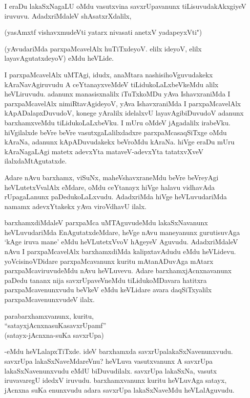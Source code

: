 I eraDu lakaSxNagaLU oMdu vasutxvina savxrUpavanunx tiLisuvudakAkxgiyeV iruvuvu. AdadxriMdaleV shAsatxrXdalilx,

\begin{shloka}
(yasAmxtf vishavxmudeVti yatarx nivasati anetxV yadapeyxVti")
\end{shloka}

(yAvudariMda parxpaMcavelAlx huTiTxdeyoV. elilx ideyoV, elilx layavAgutatxdeyoV) eMdu heVLide.

I parxpaMcavelAlx uMTAgi, idudx, anaMtara nashisihoVguvudakekx kAraNavAgiruvudu A ceYtanayxveMdeV tiLidukoLaLxbeVkeMdu alilx heVLiruvudu. adanunx manasisxnalilx iTuTxkoMDu yAva IshavxraniMda I parxpaMcavelAlx nimiRtavAgideyoV, yAva IshavxraniMda I parxpaMcavelAlx kApADalapxDuvudoV, konege yAralilx idelalxvU layavAgibiDuvudoV adanunx barxhamxveMdu tiLidukoLaLxbeVku. I mUru oMdeV jAgadalilx irabeVku. hiVgilalxde beVre beVre vasutxgaLalilxdadxre parxpaMcasaqSiTxge oMdu kAraNa, adanunx kApADuvudakekx beVroMdu kAraNa. hiVge eraDu mUru kAraNagaLAgi matetx adevxYta mataveV-adevxYta tatatxvXveV ilalxdaMtAgutatxde. 

Adare nAvu barxhamx, viSuNx, maheVshavxraneMdu beVre beVreyAgi heVLutetxVvalAlx eMdare, oMdu ceYtanayx hiVge halavu vidhavAda rUpagaLanunx paDedukoLaLxvudu. AdadxriMda hiVge heVLuvudariMda namamx adevxYtakekx yAva viroVdhavU ilalx. 

barxhamxdiMdaleV parxpaMca uMTAguvudeMdu lakaSxNavanunx heVLuvudariMda EnAgutatxdeMdare, heVge nAvu maneyanunx gurutisuvAga `kAge iruva mane' eMdu heVLutetxVvoV hAgeyeV Aguvudu. AdadxriMdaleV nAvu I parxpaMcavelAlx barxhamxdiMda kalipxtavAdudu eMdu heVLidevu. yoVcisinoVDidare parxpaMcavanunx kuritu mAtanADuvAga mAtarx parxpaMcaviruvudeMdu nAvu heVLuvevu. Adare barxhamxjAcnxnavanunx paDedu tananx nija savxrUpaveVneMdu tiLidukoMDavara hatitxra parxpaMcavenunxvudu beVkeV eMdu keVLidare avara daqSiTxyalilx parxpaMcavenunxvudeV ilalx.

\begin{shloka}
parabarxhamxvanunx, kuritu, \\
``satayxjAcnxnasuKasavxrUpamf''\\
(satayx-jAcnxna-suKa savxrUpa)
\end{shloka}

-eMdu heVLalapxTiTxde. ideV barxhamxda savxrUpalakaSxNavenunxvudu. savxrUpa lakaSxNaveMdareVnu? heVLuva vasutxvanunx A savxrUpa lakaSxNavenunxvudu eMdU biDuvudilalx. savxrUpa lakaSxNa, vasutx iruvavaregU idedxV iruvudu. barxhamxvanunx kuritu heVLuvAga satayx, jAcnxna suKa enunxvudu adara savxrUpa lakaSxNaveMdu heVLalAguvudu.

